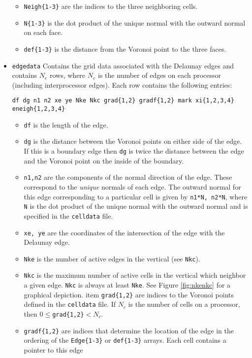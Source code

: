 \begin{itemize}
\begin{itemize}
\item \verb+Neigh{1-3}+ are the indices to the three neighboring cells.  
\item \verb+N{1-3}+ is the dot product of the unique normal with the outward normal on each
face.
\item \verb+def{1-3}+ is the distance from the Voronoi point to the three faces.
\end{itemize}
\item \verb+edgedata+ Contains the grid data associated with the Delaunay edges and contains
$N_e$ rows, where $N_e$ is the number of edges on each processor (including interprocessor edges).
Each row contains the following entries:
\begin{verbatim}
df dg n1 n2 xe ye Nke Nkc grad{1,2} gradf{1,2} mark xi{1,2,3,4} eneigh{1,2,3,4}
\end{verbatim}
\begin{itemize}
\item \verb+df+ is the length of the edge.
\item \verb+dg+ is the distance between the Voronoi points on either side of the edge.  If 
this is a boundary edge then \verb+dg+ is twice the distance between the edge and the Voronoi
point on the inside of the boundary.
\item \verb+n1,n2+ are the components of the normal direction of the edge.  These correspond
to the {\it unique} normals of each edge.  The outward normal for this edge corresponding to
a particular cell is given by \verb+n1*N, n2*N+, where \verb+N+ is the dot product of the
unique normal with the outward normal and is specified in the \verb+celldata+ file.
\item \verb+xe, ye+ are the coordinates of the intersection of the edge with the Delaunay
edge.  
\item \verb+Nke+ is the number of active edges in the vertical (see \verb+Nkc+).
\item \verb+Nkc+ is the maximum number of active cells in the vertical which neighbor a given edge.  \verb+Nkc+ is
always at least \verb+Nke+.  See Figure \ref{fig:nkenkc} for a graphical depiction.
item \verb+grad{1,2}+ are indices to the Voronoi points defined in the \verb+celldata+ file.
If $N_c$ is the number of cells on a processor, then $0\le$\verb+grad{1,2}+$<N_c$.
\item \verb+gradf{1,2}+ are indices that determine the location of the edge in the ordering
of the \verb+Edge{1-3}+ or \verb+def{1-3}+ arrays.  Each cell contains a pointer to this edge

\end{itemize}
\end{itemize}
